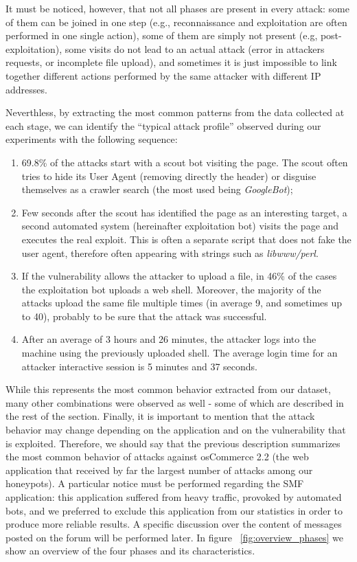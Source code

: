 It must be noticed, however, that not all phases are present in every attack: some of them can be joined in one step (e.g., reconnaissance and exploitation are often performed in one single action), some of them are simply not present (e.g, post-exploitation), some visits do not lead to an actual attack (error in attackers requests, or incomplete file upload), and sometimes it is just impossible to link together different actions performed by the same attacker with different IP addresses.

Neverthless, by extracting the most common patterns from the data collected at each stage, we can identify the ``typical attack profile'' observed during our experiments with the following sequence:

\begin{enumerate}
\item
69.8\% of the attacks start with a scout bot visiting the page. The scout often tries to hide its User Agent (removing directly the header) or disguise themselves as a crawler search (the most used being \emph{GoogleBot});
\item
Few seconds after the scout has identified the page as an interesting target, a second automated system (hereinafter exploitation bot) visits the page and executes the real exploit. This is often a separate script that does not fake the user agent, therefore often appearing with strings such as \emph{libwww/perl}.
\item
If the vulnerability allows the attacker to upload a file, in 46\% of the cases the exploitation bot uploads a web shell. Moreover, the majority of the attacks upload the same file multiple times (in average 9, and sometimes up to 40), probably to be sure that the attack was successful.
\item
After an average of 3 hours and 26 minutes, the attacker logs into the machine using the previously uploaded shell. The average login time for an attacker interactive session is 5 minutes and 37 seconds.
\end{enumerate}

While this represents the most common behavior extracted from our dataset, many other combinations were observed as well - some of which are described in the rest of the section. Finally, it is important to mention that the attack behavior may change depending on the application and on the vulnerability that is exploited. Therefore, we should say that the previous description summarizes the most common behavior of attacks against osCommerce 2.2 (the web application that received by far the largest number of attacks among our honeypots). A particular notice must be performed regarding the SMF application: this application suffered from heavy traffic, provoked by automated bots, and we preferred to exclude this application from our statistics in order to produce more reliable results. A specific discussion over the content of messages posted on the forum will be performed later. In figure ~\ref{fig:overview_phases} we show an overview of the four phases and its characteristics.

